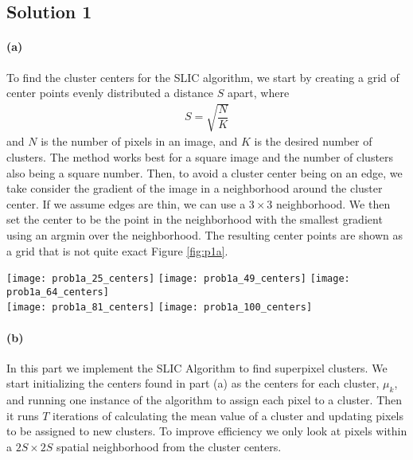 \documentclass{article}
\newcommand{\solution}[1]{\clearpage \subsection*{Solution #1}}
\newcommand{\spart}[1]{\paragraph{(#1)}}
\begin{document}

\solution{1} 

\spart{a} To find the cluster centers for the SLIC algorithm, we start by creating a grid of center points evenly distributed a distance $S$ apart, where
\begin{align}
	S = \sqrt{\dfrac{N}{K}} 
\end{align} 
and $N$ is the number of pixels in an image, and $K$ is the desired number of clusters. The method works best for a square image and the number of clusters also being a square number. Then, to avoid a cluster center being on an edge, we take consider the gradient of the image in a neighborhood around the cluster center. If we assume edges are thin, we can use a $3\times 3$ neighborhood. We then set the center to be the point in the neighborhood with the smallest gradient using an argmin over the neighborhood. The resulting center points are shown as a grid that is not quite exact Figure \ref{fig:p1a}. 

\begin{figure*}[!h]
  \centering
  \texttt{[image: prob1a\_25\_centers]}
  \texttt{[image: prob1a\_49\_centers]}
  \texttt{[image: prob1a\_64\_centers]}\\
  \texttt{[image: prob1a\_81\_centers]}
  \texttt{[image: prob1a\_100\_centers]}
  \caption{Center Locations for SLIC Clusters}
  \label{fig:p1a}
\end{figure*}

\spart{b} In this part we implement the SLIC Algorithm to find superpixel clusters. We start initializing the centers found in part (a) as the centers for each cluster, $\mu_k$, and running one instance of the algorithm to assign each pixel to a cluster. Then it runs $T$ iterations of calculating the mean value of a cluster and updating pixels to be assigned to new clusters. To improve efficiency we only look at pixels within a $2S\times 2S$ spatial neighborhood from the cluster centers. 
\end{document}
